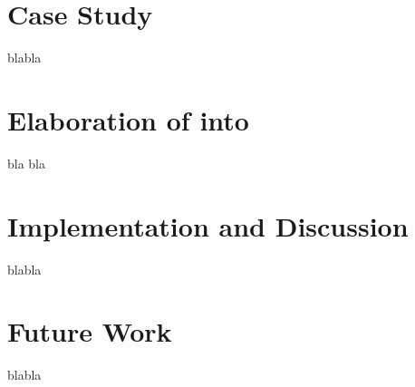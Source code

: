 \documentclass{beamer}
\begin{document}
\section{Case Study}

blabla

\section{Elaboration of \name into \bname}

bla bla

\section{Implementation and Discussion}

blabla

\section{Future Work}

blabla


\end{document}
